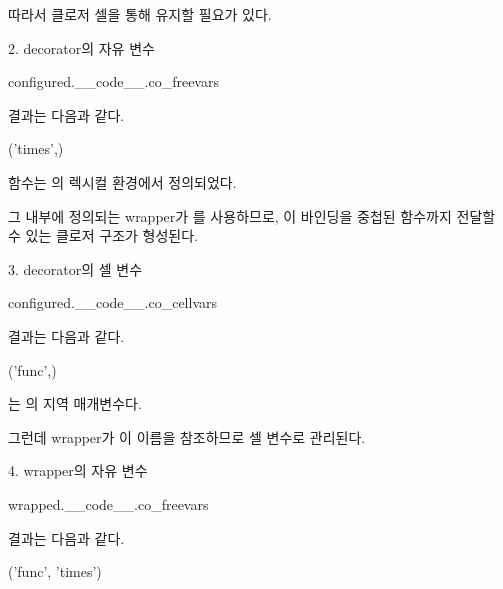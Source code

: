 따라서 클로저 셀을 통해 유지할 필요가 있다.

\begin{dhknote}
\begin{dhksmry}[centered]
2. decorator의 자유 변수
\end{dhksmry}
\end{dhknote}

\begin{dhkcode}
configured.__code__.co_freevars
\end{dhkcode}

결과는 다음과 같다.

\begin{dhkzsh}
('times',)
\end{dhkzsh}

 함수는 의 렉시컬 환경에서 정의되었다.

그 내부에 정의되는 wrapper가 를 사용하므로, 이 바인딩을 중첩된 함수까지 전달할 수 있는 클로저 구조가 형성된다.

\begin{dhknote}
\begin{dhksmry}[centered]
3. decorator의 셀 변수
\end{dhksmry}
\end{dhknote}

\begin{dhkcode}
configured.__code__.co_cellvars
\end{dhkcode}

결과는 다음과 같다.

\begin{dhkzsh}
('func',)
\end{dhkzsh}

는 의 지역 매개변수다.

그런데 wrapper가 이 이름을 참조하므로 셀 변수로 관리된다.

\begin{dhknote}
\begin{dhksmry}[centered]
4. wrapper의 자유 변수
\end{dhksmry}
\end{dhknote}

\begin{dhkcode}
wrapped.__code__.co_freevars
\end{dhkcode}

결과는 다음과 같다.

\begin{dhkzsh}
('func', 'times')
\end{dhkzsh}


